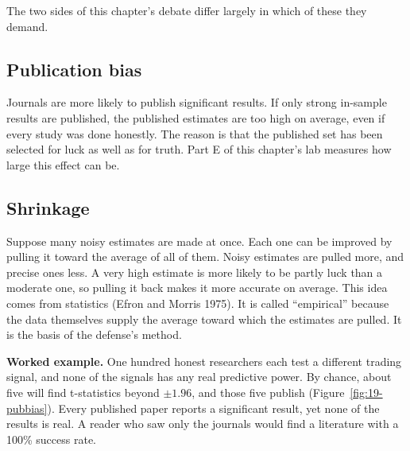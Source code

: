 The two sides of this chapter's debate differ largely in which of these they demand.

\subsection{Publication bias}

Journals are more likely to publish significant results. If only strong in-sample results are published, the published estimates are too high on average, even if every study was done honestly. The reason is that the published set has been selected for luck as well as for truth. Part E of this chapter's lab measures how large this effect can be.

\subsection{Shrinkage}

Suppose many noisy estimates are made at once. Each one can be improved by pulling it toward the average of all of them. Noisy estimates are pulled more, and precise ones less. A very high estimate is more likely to be partly luck than a moderate one, so pulling it back makes it more accurate on average. This idea comes from  statistics (Efron and Morris 1975). It is called ``empirical'' because the data themselves supply the average toward which the estimates are pulled. It is the basis of the defense's method.

\textbf{Worked example.} One hundred honest researchers each test a different trading signal, and none of the signals has any real predictive power. By chance, about five will find t-statistics beyond $\pm 1.96$, and those five publish (Figure~\ref{fig:19-pubbias}). Every published paper reports a significant result, yet none of the results is real. A reader who saw only the journals would find a literature with a 100\% success rate.

